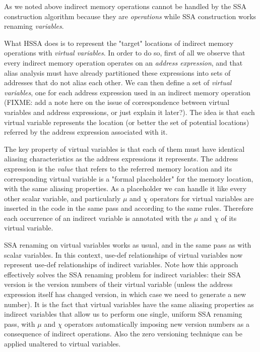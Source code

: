 As we noted above indirect memory operations cannot be handled by the SSA construction algorithm because they are {\em operations} while SSA construction works renaming {\em variables}.

What HSSA does is to represent the "target" locations of indirect memory operations with {\em virtual variables}.
In order to do so, first of all we observe that every indirect memory operation operates on an {\em address expression}, and that alias analysis must have already partitioned these expressions into sets of addresses that do not alias each other.
We can then define a set of {\em virtual variables}, one for each address expression used in an indirect memory operation (FIXME: add a note here on the issue of correspondence between virtual variables and address expressions, or just explain it later?).
The idea is that each virtual variable represents the location (or better the set of potential locations) referred by the address expression associated with it.

The key property of virtual variables is that each of them must have identical aliasing characteristics as the address expressions it represents.
The address expression is the {\em value} that refers to the referred memory location and its corresponding virtual variable is a "formal placeholder" for the memory location, with the same aliasing properties.
As a placeholder we can handle it like every other scalar variable, and particularly $\mu$ and $\chi$ operators for virtual variables are inserted in the code in the same pass and according to the same rules.
Therefore each occurrence of an indirect variable is annotated with the $\mu$ and $\chi$ of its virtual variable.

SSA renaming on virtual variables works as usual, and in the same pass as with scalar variables.
In this context, use-def relationships of virtual variables now represent use-def relationships of indirect variables.
Note how this approach effectively solves the SSA renaming problem for indirect variables: their SSA version is the version numbers of their virtual variable (unless the address expression itself has changed version, in which case we need to generate a new number).
It is the fact that virtual variables have the same aliasing properties as indirect variables that allow us to perform one single, uniform SSA renaming pass, with $\mu$ and $\chi$ operators automatically imposing new version numbers as a consequence of indirect operations.
Also the zero versioning technique can be applied unaltered to virtual variables.

